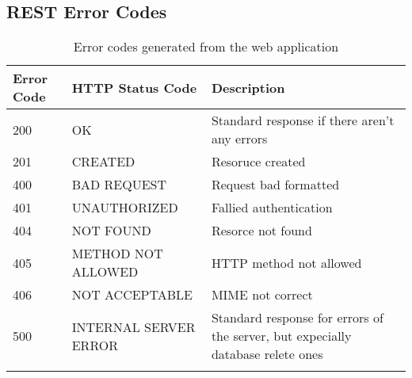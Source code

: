 \subsection{REST Error Codes}


\begin{longtable}{|p{}|p{} |p{}|} 
\hline
\textbf{Error Code} & \textbf{HTTP Status Code} & \textbf{Description} \\\hline
200  & OK &  Standard response if there aren't any errors \\\hline
201  & CREATED &  Resoruce created \\\hline
400  & BAD REQUEST &  Request bad formatted\\\hline
401  & UNAUTHORIZED &  Fallied authentication\\\hline
404  & NOT FOUND &  Resorce not found\\\hline
405  & METHOD NOT ALLOWED &  HTTP method not allowed \\\hline
406  & NOT ACCEPTABLE &  MIME not correct \\\hline
500  & INTERNAL SERVER ERROR &  Standard response for errors of the server, but expecially database relete ones \\\hline
\caption{Error codes generated from the web application}
\label{tab:errorcodes}
\end{longtable}